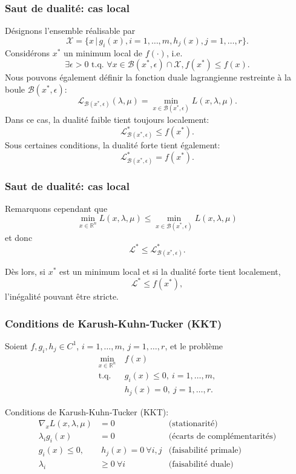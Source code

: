\documentclass[usepdftitle=false]{beamer}
\def\cB{\mathcal{B}}
\def\cL{\mathcal{L}}
\def\cX{\mathcal{X}}
\begin{document}
\begin{frame}
\frametitle{Saut de dualité: cas local}

Désignons l'ensemble réalisable par
$$
\cX = \{ x \,|\, g_i(x), i = 1,\ldots,m, h_j(x), j = 1,\ldots,r \}.
$$
Considérons $x^*$ un minimum local de $f(\cdot)$, i.e.
$$
\exists \epsilon > 0  \text{ t.q. } \forall x \in \cB(x^*, \epsilon) \cap \cX, f(x^*) \leq f(x).
$$
Nous pouvons également définir la fonction duale lagrangienne restreinte à la boule $\cB(x^*, \epsilon)$:
$$
\cL_{\cB(x^*, \epsilon)}(\lambda, \mu) = \min_{x \in \cB(x^*, \epsilon)} L(x,\lambda, \mu).
$$
Dans ce cas, la dualité faible tient toujours localement:
$$
\cL^*_{\cB(x^*, \epsilon)} \leq f(x^*).
$$
Sous certaines conditions, la dualité forte tient également:
$$
\cL^*_{\cB(x^*, \epsilon)} = f(x^*).
$$

\end{frame}

\begin{frame}
\frametitle{Saut de dualité: cas local}

Remarquons cependant que
$$
\min_{x \in \mathbb{R}^n} L(x, \lambda, \mu) 
\leq \min_{x \in \cB(x^*, \epsilon)} L(x, \lambda, \mu) 
$$
et donc
$$
\cL^* \leq \cL^*_{\cB(x^*, \epsilon)}.
$$

\mbox{}

Dès lors, si $x^*$ est un minimum local et si la dualité forte tient localement,
$$
\cL^* \leq f(x^*),
$$
l'inégalité pouvant être stricte.

\end{frame}

\begin{frame}
\frametitle{Conditions de Karush-Kuhn-Tucker (KKT)}

Soient $f, g_i, h_j \in C^1$, $i = 1,\ldots,m$, $j = 1,\ldots,r$, et le problème
\begin{align*}
\min_{x \in \mathbb{R}^n} \ & f(x) \\
\mbox{t.q. } & g_i(x) \leq 0,\ i = 1,\ldots,m, \\
& h_j(x) = 0,\ j = 1,\ldots,r.
\end{align*}

Conditions de Karush-Kuhn-Tucker (KKT):
\begin{align*}
\nabla_x L(x,\lambda,\mu) &= 0 & \mbox{(stationarité)}\\
\lambda_i g_i(x) &= 0 & \mbox{(écarts de complémentarités)} \\
g_i(x) \leq 0, &\ h_j(x) = 0\ \forall i,j & \mbox{(faisabilité primale)} \\
\lambda_i &\geq 0\ \forall i & \mbox{(faisabilité duale)}
\end{align*}

\end{frame}
\end{document}
